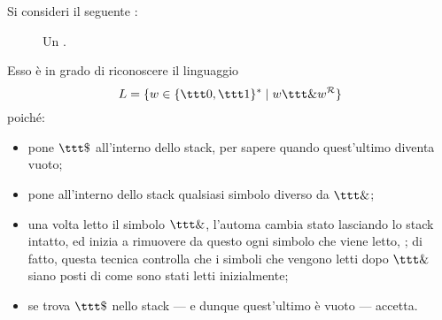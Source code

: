 \documentclass[a4paper, 12pt]{report}
\begin{document}
    \begin{example}[\PDA]
        Si consideri il seguente \PDA:

        \begin{figure}[H]
            \centering
             \caption{Un \PDA.}
        \end{figure}

        Esso è in grado di riconoscere il linguaggio $$L=\{w \in \{\ttt 0, \ttt 1\}^* \mid w \ttt \& w ^\mathcal{R}\}$$ poiché:

        \begin{itemize}
            \item pone $\ttt \$$ all'interno dello stack, per sapere quando quest'ultimo diventa vuoto;
            \item pone all'interno dello stack qualsiasi simbolo diverso da $\ttt \&$;
            \item una volta letto il simbolo $\ttt \&$, l'automa cambia stato lasciando lo stack intatto, ed inizia a rimuovere da questo ogni simbolo che viene letto, ; di fatto, questa tecnica controlla che i simboli che vengono letti dopo $\ttt \&$ siano posti  di come sono stati letti inizialmente;
            \item se trova $\ttt \$$ nello stack --- e dunque quest'ultimo è vuoto --- accetta.
        \end{itemize}
    \end{example}
\end{document}
